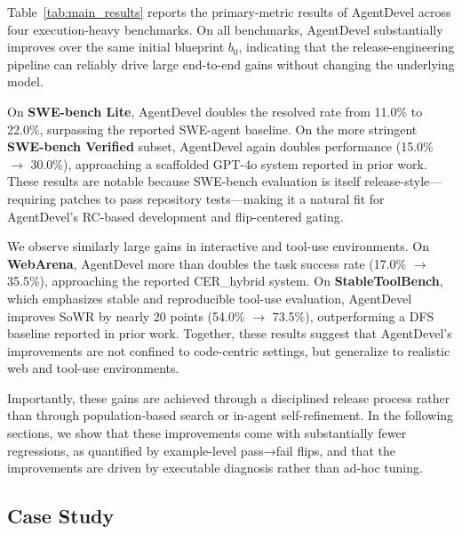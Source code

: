 \documentclass[11pt]{article}
\begin{document}
Table~\ref{tab:main_results} reports the primary-metric results of AgentDevel across four execution-heavy benchmarks. On all benchmarks, AgentDevel substantially improves over the same initial blueprint \(b_0\), indicating that the release-engineering pipeline can reliably drive large end-to-end gains without changing the underlying model.

On \textbf{SWE-bench Lite}, AgentDevel doubles the resolved rate from 11.0\% to 22.0\%, surpassing the reported SWE-agent baseline. On the more stringent \textbf{SWE-bench Verified} subset, AgentDevel again doubles performance (15.0\% $\rightarrow$ 30.0\%), approaching a scaffolded GPT-4o system reported in prior work. These results are notable because SWE-bench evaluation is itself release-style—requiring patches to pass repository tests—making it a natural fit for AgentDevel’s RC-based development and flip-centered gating.

We observe similarly large gains in interactive and tool-use environments. On \textbf{WebArena}, AgentDevel more than doubles the task success rate (17.0\% $\rightarrow$ 35.5\%), approaching the reported CER\_hybrid system. On \textbf{StableToolBench}, which emphasizes stable and reproducible tool-use evaluation, AgentDevel improves SoWR by nearly 20 points (54.0\% $\rightarrow$ 73.5\%), outperforming a DFS baseline reported in prior work. Together, these results suggest that AgentDevel’s improvements are not confined to code-centric settings, but generalize to realistic web and tool-use environments.

Importantly, these gains are achieved through a disciplined release process rather than through population-based search or in-agent self-refinement. In the following sections, we show that these improvements come with substantially fewer regressions, as quantified by example-level pass→fail flips, and that the improvements are driven by executable diagnosis rather than ad-hoc tuning.

\subsection{Case Study}
\end{document}
